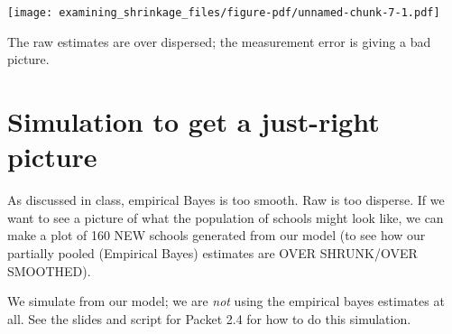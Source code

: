\documentclass[
  letterpaper,
  DIV=11,
  numbers=noendperiod]{scrreprt}
\newenvironment{Shaded}{}{}
\newcommand{\AttributeTok}[1]{\textcolor[rgb]{0.49,0.56,0.16}{#1}}
\newcommand{\DecValTok}[1]{\textcolor[rgb]{0.25,0.63,0.44}{#1}}
\newcommand{\FloatTok}[1]{\textcolor[rgb]{0.25,0.63,0.44}{#1}}
\newcommand{\FunctionTok}[1]{\textcolor[rgb]{0.02,0.16,0.49}{#1}}
\newcommand{\NormalTok}[1]{#1}
\newcommand{\OtherTok}[1]{\textcolor[rgb]{0.00,0.44,0.13}{#1}}
\newcommand{\SpecialCharTok}[1]{\textcolor[rgb]{0.25,0.44,0.63}{#1}}
\newcommand{\StringTok}[1]{\textcolor[rgb]{0.25,0.44,0.63}{#1}}
\begin{document}
\begin{Shaded}
\end{Shaded}

\begin{center}
\texttt{[image: examining\_shrinkage\_files/figure-pdf/unnamed-chunk-7-1.pdf]}
\end{center}

The raw estimates are over dispersed; the measurement error is giving a
bad picture.

\section{Simulation to get a just-right
picture}\label{simulation-to-get-a-just-right-picture}

As discussed in class, empirical Bayes is too smooth. Raw is too
disperse. If we want to see a picture of what the population of schools
might look like, we can make a plot of 160 NEW schools generated from
our model (to see how our partially pooled (Empirical Bayes) estimates
are OVER SHRUNK/OVER SMOOTHED).

We simulate from our model; we are \emph{not} using the empirical bayes
estimates at all. See the slides and script for Packet 2.4 for how to do
this simulation.
\end{document}
